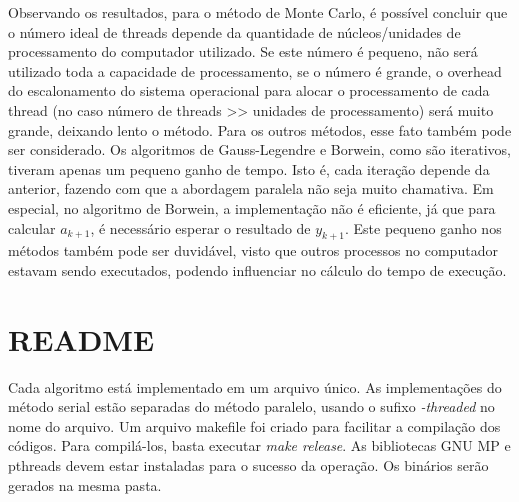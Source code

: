 \documentclass[a4paper]{article}
\begin{document}
Observando os resultados, para o método de Monte Carlo, é possível concluir que o 
número ideal de threads depende da quantidade de núcleos/unidades de processamento
do computador utilizado. Se este número é pequeno, não será utilizado toda a capacidade 
de processamento, se o número é grande, o overhead do escalonamento do sistema operacional 
para alocar o processamento de cada thread (no caso número de threads >> unidades de processamento) 
será muito grande, deixando lento o método. Para os outros métodos, esse fato também
pode ser considerado. Os algoritmos de Gauss-Legendre e Borwein, como são iterativos,
tiveram apenas um pequeno ganho de tempo. Isto é, cada iteração depende da anterior,
fazendo com que a abordagem paralela não seja muito chamativa. Em especial, no
algoritmo de Borwein, a implementação não é eficiente, já que para calcular \begin{math}a_{k+1}\end{math}, 
é necessário esperar o resultado de \begin{math}y_{k+1}\end{math}. Este pequeno ganho nos
métodos também pode ser duvidável, visto que outros processos no computador 
estavam sendo executados, podendo influenciar no cálculo do tempo de execução. 

\section{README}
Cada algoritmo está implementado em um arquivo único. As implementações do método
serial estão separadas do método paralelo, usando o sufixo \emph{-threaded} no nome do arquivo.
Um arquivo makefile foi criado para facilitar a compilação dos códigos. Para compilá-los,
basta executar \emph{make release}. As bibliotecas GNU MP e pthreads devem estar
instaladas para o sucesso da operação. Os binários serão gerados na mesma pasta.
\end{document}
